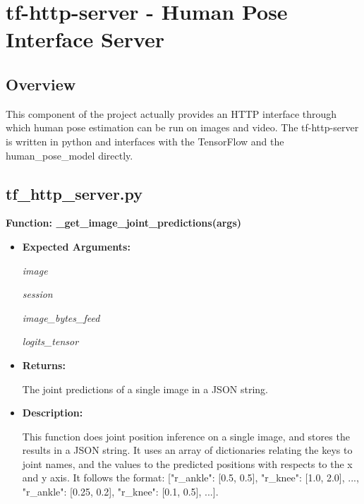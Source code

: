\documentclass{scrreprt}
\begin{document}
\section{tf-http-server - Human Pose Interface Server}

\subsection{Overview}

This component of the project actually provides an HTTP interface through which human pose estimation can be run on images and video. The tf-http-server is written in python and interfaces with the TensorFlow and the human\_pose\_model directly.

\subsection{tf\_http\_server.py}

\textbf{Function: \_get\_image\_joint\_predictions(args)}
\begin{itemize}
    \item \textbf{Expected Arguments:}

            \quad\textit{image}

            \quad\textit{session}

            \quad\textit{image\_bytes\_feed}

            \quad\textit{logits\_tensor}

    \item \textbf{Returns:}

            The joint predictions of a single image in a JSON string.

    \item \textbf{Description:}

            This function does joint position inference on a single image, and stores the results in a JSON string. It uses an array of dictionaries relating the keys to joint names, and the values to the predicted positions with respects to the x and y axis. It follows the format: [{"r\_ankle": [0.5, 0.5], "r\_knee": [1.0, 2.0], ...}, {"r\_ankle": [0.25, 0.2], "r\_knee": [0.1, 0.5], ...}].

\end{itemize}
\end{document}
